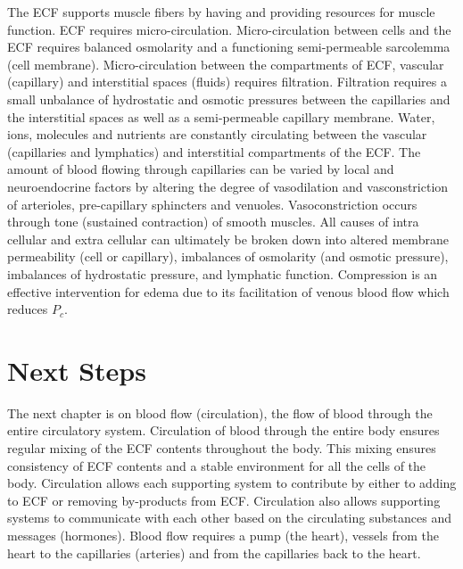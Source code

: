 The ECF supports muscle fibers by having and providing resources for muscle function. ECF requires micro-circulation. Micro-circulation between cells and the ECF requires balanced osmolarity and a functioning semi-permeable sarcolemma (cell membrane). Micro-circulation between the compartments of ECF, vascular (capillary) and interstitial spaces (fluids) requires filtration. Filtration requires a small unbalance of hydrostatic and osmotic pressures between the capillaries and the interstitial spaces as well as a semi-permeable capillary membrane. Water, ions, molecules and nutrients are constantly circulating between the vascular (capillaries and lymphatics) and interstitial compartments of the ECF. 
The amount of blood flowing through capillaries can be varied by local and neuroendocrine factors by altering the degree of vasodilation and vasconstriction of arterioles, pre-capillary sphincters and venuoles. Vasoconstriction occurs through tone (sustained contraction) of smooth muscles. 
All causes of intra cellular and extra cellular can ultimately be broken down into altered membrane permeability (cell or capillary), imbalances of osmolarity (and osmotic pressure), imbalances of hydrostatic pressure, and lymphatic function. Compression is an effective intervention for edema due to its facilitation of venous blood flow which reduces $P_c$.


\section{Next Steps}

The next chapter is on blood flow (circulation), the flow of blood through the entire circulatory system. Circulation of blood through the entire body ensures regular mixing of the ECF contents throughout the body. This mixing ensures consistency of ECF contents and a stable environment for all the cells of the body. Circulation allows each supporting system to contribute by either to adding to ECF or removing by-products from ECF. Circulation also allows supporting systems to communicate with each other based on the circulating substances and messages (hormones). Blood flow requires a pump (the heart), vessels from the heart to the capillaries (arteries) and from the capillaries back to the heart.

\printbibliography[heading=subbibintoc]
